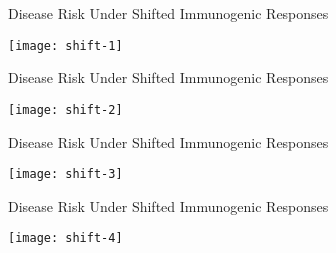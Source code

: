 \documentclass{beamer}
\begin{document}

\begin{frame}[c]{Disease Risk Under Shifted Immunogenic Responses}

\hspace*{-1cm}\texttt{[image: shift-1]}

\note{
}

\end{frame}


\begin{frame}[c]{Disease Risk Under Shifted Immunogenic Responses}

\hspace*{-1cm}\texttt{[image: shift-2]}

\note{
}

\end{frame}


\begin{frame}[c]{Disease Risk Under Shifted Immunogenic Responses}

\hspace*{-1cm}\texttt{[image: shift-3]}

\note{
}

\end{frame}


\begin{frame}[c]{Disease Risk Under Shifted Immunogenic Responses}

\hspace*{-1cm}\texttt{[image: shift-4]}

\note{
}

\end{frame}

\end{document}
